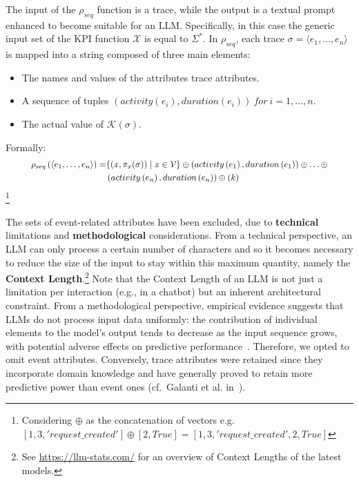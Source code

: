 \documentclass[manuscript,screen,review]{acmart}
\newcommand{\MX}{\mathcal{X}}
\newcommand{\MK}{\mathcal{K}}
\begin{document}
The input of the $\rho_{seq}$ function is a trace, while the output is a textual prompt enhanced to become suitable for an LLM. Specifically, in this case the generic input set of the KPI function $\MX$ is equal to $\Sigma^*$. In $\rho_{seq}$, each trace $\sigma=\langle e_1,\ldots,e_n \rangle$ is mapped into a string composed of three main elements:
\begin{itemize}
\item The names and values of the attributes trace attributes.
\item A sequence of tuples ${ \left(activity\left(e_i\right),duration\left(e_i\right)\right)\ for\ i=1,\ldots,n}$.
\item The actual value of $\MK(\sigma)$.
\end{itemize}
Formally:
\[
\scalebox{0.9}{$
    \begin{aligned}\rho_{seq}\left(\langle e_1,\ldots,e_n\rangle\right)=& \{(x, \pi_x(\sigma)) \mid x \in \mathcal{V}\} \displaystyle\oplus \left(activity\left(e_1\right),duration\left(e_1\right)\right)\displaystyle\oplus\ldots\displaystyle\oplus\notag \\&\left(activity\left(e_n\right),duration\left(e_n\right)\right)\displaystyle\oplus \left(k\right)
    \end{aligned}$}
\]
\footnote{Considering $\displaystyle\oplus$ as the concatenation of vectors e.g.\newline $[1,3,'request\_ created']\oplus[2,True]=[1,3,'request\_ created',2,True]$} 





\noindent
The sets of event-related attributes have been excluded, due to \textbf{technical} limitations and \textbf{methodological} considerations. From a technical perspective, an LLM can only process a certain number of characters and so it becomes necessary to reduce the size of the input to stay within this maximum quantity, namely the \textbf{Context Length}.\footnote{See \href{https://llm-stats.com/}{https://llm-stats.com/} for an overview of Context Lengths of the latest models.} Note that the Context Length of an LLM is not just a limitation per interaction (e.g., in a chatbot) but an inherent architectural constraint. From a methodological perspective, empirical evidence suggests that LLMs do not process input data uniformly: the contribution of individual elements to the model's output tends to decrease as the input sequence grows, with potential adverse effects on predictive performance~\cite{kuratov2024babilong,2024longcontext}. Therefore, we opted to omit event attributes. Conversely, trace attributes were retained since they incorporate domain knowledge and have generally proved to retain more predictive power than event ones (cf.\ Galanti et al. in~\cite{DBLP:journals/eaai/GalantiLMNMSM23}).
\end{document}
